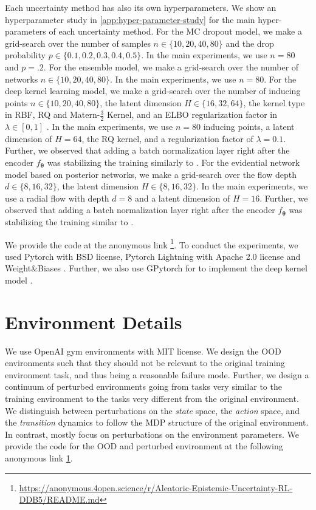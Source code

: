 Each uncertainty method has also its own hyperparameters. We show an hyperparameter study in \cref{app:hyper-parameter-study} for the main hyper-parameters of each uncertainty method. For the MC dropout model, we make a grid-search over the number of samples $n \in \{10, 20, 40, 80\}$ and the drop probability $p \in \{0.1, 0.2, 0.3, 0.4, 0.5\}$. In the main experiments, we use $n=80$ and $p=.2$. For the ensemble model, we make a grid-search over the number of networks $n \in \{10, 20, 40, 80\}$. In the main experiments, we use $n=80$. For the deep kernel learning model, we make a grid-search over the number of inducing points $n \in \{10, 20, 40, 80\}$, the latent dimension $H \in \{16, 32, 64\}$, the kernel type in RBF, RQ and Matern-$\frac{3}{2}$ Kernel, and an ELBO regularization factor in $\lambda \in [0, 1]$ . In the main experiments, we use $n=80$ inducing points, a latent dimension of $H=64$, the RQ kernel, and a regularization factor of $\lambda=0.1$. Further, we observed that adding a batch normalization layer right after the encoder $f_{\bm{\theta}}$ was stabilizing the training similarly to \citet{charpentier2020}. For the evidential network model based on posterior networks, we make a grid-search over the flow depth $d \in \{8, 16, 32\}$, the latent dimension $H \in \{8, 16, 32\}$. In the main experiments, we use a radial flow with depth $d=8$ and a latent dimension of $H=16$. Further, we observed that adding a batch normalization layer right after the encoder $f_{\bm{\theta}}$ was stabilizing the training similar to \citet{charpentier2020}.

We provide the code at the anonymous link \footnote{\label{link:code}\url{https://anonymous.4open.science/r/Aleatoric-Epistemic-Uncertainty-RL-DDB5/README.md}}. To conduct the experiments, we used Pytorch \citep{pytorch} with BSD license, Pytorch Lightning \citep{pytorch-lightning} with Apache 2.0 license and Weight\&Biases \cite{wandb}. Further, we also use GPytorch for to implement the deep kernel model \cite{gpytorch}.

\section{Environment Details}
\label{app:environments-details}

We use OpenAI gym environments \citep{gym} with MIT license. We design the OOD environments such that they should not be relevant to the original training environment task, and thus being a reasonable failure mode. Further, we design a continuum of perturbed environments going from tasks very similar to the training environment to the tasks very different from the original environment. We distinguish between perturbations on the \emph{state} space, the \emph{action} space, and the \emph{transition} dynamics to follow the MDP structure of the original environment. In contrast, \citep{assessing-generalization-rl, benchmark-ood-detection-rl} mostly focus on perturbations on the environment parameters. We provide the code for the OOD and perturbed environment at the following anonymous link \cref{link:code}.

